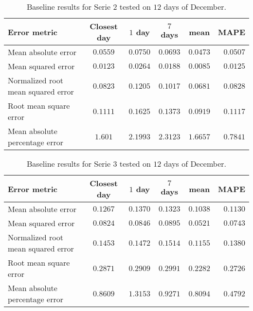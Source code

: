 \begin{table}[ht]
	\centering
	\begin{tabular}{@{}l|ccccr@{}} \toprule
		\textbf{Error metric}	& \textbf{Closest day} & \textbf{$ 1 $ day} & \textbf{$ 7 $ days} & \textbf{mean} & \textbf{MAPE}\\\midrule
		Mean absolute error& $0.0559 $&\cellcolor{red!25}$ 0.0750 $  & $0.0693 $ & \cellcolor{green!25}$ 0.0473 $ & $ 0.0507 $\\
		Mean squared error& $0.0123 $&\cellcolor{red!25}$ 0.0264 $  & $0.0188 $ & \cellcolor{green!25}$ 0.0085 $ & $ 0.0125 $\\
		Normalized root mean squared error& $0.0823 $&\cellcolor{red!25}$ 0.1205$  & $0.1017$ & \cellcolor{green!25}$ 0.0681$ & $ 0.0828$\\
		Root mean square error& $0.1111 $&$ 0.1625$  &\cellcolor{red!25} $0.1373$ & \cellcolor{green!25}$ 0.0919$ & $ 0.1117$\\
		Mean absolute percentage error & $ 1.601 $&$ 2.1993 $  &\cellcolor{red!25} $ 2.3123 $ & $ 1.6657 $ & \cellcolor{green!25}$ 0.7841 $\\\bottomrule
	\end{tabular}
	\caption{Baseline results for Serie $ 2 $ tested on $ 12 $ days of December.}
	\label{tab:summ_data_serie2}
\end{table}

\begin{table}[ht]
	\centering
	\begin{tabular}{@{}l|ccccr@{}} \toprule
		\textbf{Error metric}	& \textbf{Closest day} & \textbf{$ 1 $ day} & \textbf{$ 7 $ days} & \textbf{mean} & \textbf{MAPE}\\\midrule
		Mean absolute error& $0.1267 $&\cellcolor{red!25}$ 0.1370 $  & $0.1323 $ &\cellcolor{green!25} $ 0.1038 $ & $ 0.1130 $\\
		Mean squared error& $0.0824 $&$ 0.0846 $  & \cellcolor{red!25}$0.0895 $ & \cellcolor{green!25}$ 0.0521 $ & $ 0.0743 $\\
		Normalized root mean squared error& $0.1453 $&$ 0.1472$  & \cellcolor{red!25}$0.1514$ & \cellcolor{green!25}$ 0.1155$ & $ 0.1380$\\
		Root mean square error& $0.2871 $&$ 0.2909$  & \cellcolor{red!25}$0.2991$ & \cellcolor{green!25}$ 0.2282$ & $ 0.2726$\\
		Mean absolute percentage error & $ 0.8609 $&\cellcolor{red!25}$ 1.3153 $  & $ 0.9271 $ & $ 0.8094  $ &\cellcolor{green!25} $ 0.4792 $\\\bottomrule
	\end{tabular}
	\caption{Baseline results for Serie $ 3 $ tested on $ 12 $ days of December.}
	\label{tab:summ_data_serie3}
\end{table}


